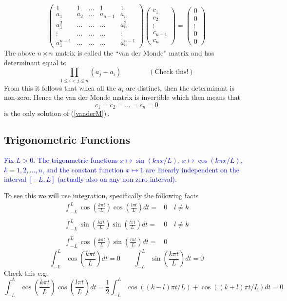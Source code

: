 \documentclass{article}
\begin{document}
\begin{equation}
\label{vanderM}
\left( \begin{array}{lllll} 1 & 1 & \ldots & 1& 1\\
a_1 & a_2 & \ldots & a_{n-1} & a_n\\
a_1^2 & \ldots & \ldots & \ldots & a_n^2 \\
\vdots &  \ldots & \ldots & \ldots & \vdots\\
a_1^{n-1} & \ldots & \ldots & \ldots & a_n^{n-1}
\end{array}\right) \left(\begin{array}{l} c_1\\c_2\\ \vdots \\ c_{n-1} \\c_n \end{array}\right) = \left(\begin{array}{l} 0 \\ 0 \\ \vdots \\ 0 \\ 0 \end{array} \right) 
\end{equation}
The above $n \times n$ matrix is called the ``van der Monde'' matrix and has determinant equal to
$$
\prod_{1\leq i < j \leq n} (a_j - a_i)\qquad \qquad (\mbox{Check this!})
$$
From this it follows that when all the $a_i$ are distinct, then the determinant is non-zero. Hence the van der Monde matrix is invertible
which then means that 
$$
c_1 = c_2 = \ldots = c_n = 0
$$
is the only solution of (\ref{vanderM})\,.

\subsection{Trigonometric Functions}

\textcolor{blue}{Fix $L > 0$. The trigonmetric functions $x \mapsto \sin (k \pi x/L)$, $x \mapsto \cos (k \pi x/L)$, $k = 1, 2, \ldots, n$, and the constant function $x \mapsto 1$
are linearly independent on the interval $[-L, L]$ (actually also on any non-zero interval).}

To see this we will use integration, specifically the following facts
$$
\begin{array}{ll}
\int_{-L}^{L} \cos (\frac{k \pi t}{L}) \cos (\frac{l \pi t}{L}) dt = & 
0 \quad l \neq k
\\
\\
\int_{-L}^{L} \sin (\frac{k \pi t}{L}) \sin (\frac{l \pi t}{L}) dt = & 0 \quad l \neq k
\\
\\
\int_{-L}^{L} \cos (\frac{k \pi t}{L}) \sin (\frac{l \pi t}{L}) dt = & 0
\end{array}
$$
$$
\int_{-L}^{L} \cos  (\frac{k \pi t}{L}) dt = 0\qquad \int_{-L}^{L} \sin  (\frac{k \pi t}{L}) dt = 0
$$
Check this e.g.
{\small 
$$
\int_{-L}^{L} \cos (\frac{k \pi t}{L}) \cos (\frac{l \pi t}{L}) dt = \frac{1}{2} \int_{-L}^{L}  \cos((k-l)\pi t/L) + \cos((k+l)\pi t/L) dt = 0
$$
}
\end{document}
